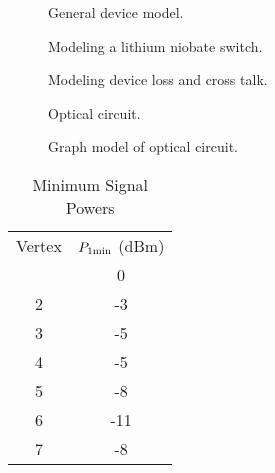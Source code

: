 \begin{figure}
\caption{General device model.} 
\end{figure}
\begin{figure} 
\caption{Modeling a lithium niobate switch.}
\end{figure}
\begin{figure}
\caption{Modeling device loss and cross talk.} 
\end{figure}
\begin{figure}
\caption{Optical circuit.} 
\end{figure}
\begin{figure} 
\caption{Graph model of optical circuit.}
\end{figure}
\begin{table}
\caption{Minimum Signal Powers}
\begin{tabular}{cc}
Vertex&$P_{1\rm min} $ (dBm) \\ \tableline
  1 &           0   \\
  2 &          -3   \\
  3 &          -5   \\
  4 &          -5   \\
  5 &          -8   \\
  6 &          -11  \\
  7 &          -8
\end{tabular}
\end{table}



